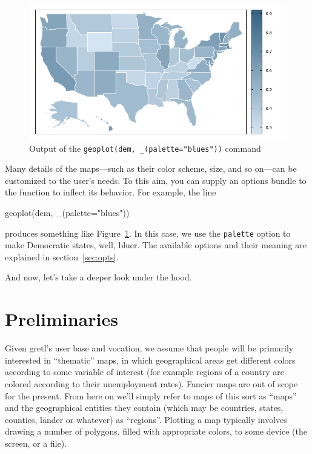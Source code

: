 \documentclass{article}
\begin{document}
\begin{figure}[htbp]
  \centering
  \includegraphics[scale=0.75]{us2020-dem}
  \caption{Output of the \texttt{geoplot(dem, \_(palette="blues"))} command}
  \label{fig:us2020-dem}
\end{figure}

Many details of the maps---such as their color scheme, size, and so
on---can be customized to the user's needs. To this aim, you can
supply an options bundle to the  function to inflect
its behavior. For example, the line
\begin{code}
  geoplot(dem, _(palette="blues"))
\end{code}
produces something like Figure~\ref{fig:us2020-dem}. In this case, we
use the \texttt{palette} option to make Democratic states, well,
bluer. The available options and their meaning are explained in
section~\ref{sec:opts}.

And now, let's take a deeper look under the hood.

\section{Preliminaries}
\label{sec:prelim}

Given gretl's user base and vocation, we assume that people will be
primarily interested in ``thematic'' maps, in which geographical areas
get different colors according to some variable of interest (for
example regions of a country are colored according to their
unemployment rates). Fancier maps are out of scope for the
present. From here on we'll simply refer to maps of this sort as
``maps'' and the geographical entities they contain (which may be
countries, states, counties, l\"ander or whatever) as
``regions''. Plotting a map typically involves drawing a number of
polygons, filled with appropriate colors, to some device (the screen,
or a file).
\end{document}
